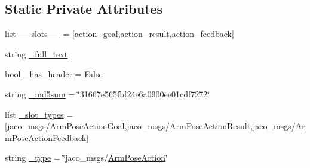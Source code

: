 \subsection*{Static Private Attributes}
\begin{DoxyCompactItemize}
\item 
list \hyperlink{classjaco__msgs_1_1msg_1_1__ArmPoseAction_1_1ArmPoseAction_a39a608192fd350c87948d9a54454e358}{\+\_\+\+\_\+slots\+\_\+\+\_\+} = \mbox{[}\textquotesingle{}\hyperlink{classjaco__msgs_1_1msg_1_1__ArmPoseAction_1_1ArmPoseAction_ababc0bb07c8926c3e8d55dfd2ddacdf4}{action\+\_\+goal}\textquotesingle{},\textquotesingle{}\hyperlink{classjaco__msgs_1_1msg_1_1__ArmPoseAction_1_1ArmPoseAction_a15c3aa8e8baead8d23478de23af61ca0}{action\+\_\+result}\textquotesingle{},\textquotesingle{}\hyperlink{classjaco__msgs_1_1msg_1_1__ArmPoseAction_1_1ArmPoseAction_a4e1fca881430990eb71fe999027640aa}{action\+\_\+feedback}\textquotesingle{}\mbox{]}
\item 
string \hyperlink{classjaco__msgs_1_1msg_1_1__ArmPoseAction_1_1ArmPoseAction_acb83d126dba77cf76e1612efa04754b5}{\+\_\+full\+\_\+text}
\item 
bool \hyperlink{classjaco__msgs_1_1msg_1_1__ArmPoseAction_1_1ArmPoseAction_a55f6889a5be10bdf4116282783bdaf60}{\+\_\+has\+\_\+header} = False
\item 
string \hyperlink{classjaco__msgs_1_1msg_1_1__ArmPoseAction_1_1ArmPoseAction_a8940e31e74f95f0132f4956a4d563b0d}{\+\_\+md5sum} = \char`\"{}31667e565fbf24e6a0900ee01cdf7272\char`\"{}
\item 
list \hyperlink{classjaco__msgs_1_1msg_1_1__ArmPoseAction_1_1ArmPoseAction_afa6ebc65498cb429b5abf5561c7889b5}{\+\_\+slot\+\_\+types} = \mbox{[}\textquotesingle{}jaco\+\_\+msgs/\hyperlink{classjaco__msgs_1_1msg_1_1__ArmPoseActionGoal_1_1ArmPoseActionGoal}{Arm\+Pose\+Action\+Goal}\textquotesingle{},\textquotesingle{}jaco\+\_\+msgs/\hyperlink{classjaco__msgs_1_1msg_1_1__ArmPoseActionResult_1_1ArmPoseActionResult}{Arm\+Pose\+Action\+Result}\textquotesingle{},\textquotesingle{}jaco\+\_\+msgs/\hyperlink{classjaco__msgs_1_1msg_1_1__ArmPoseActionFeedback_1_1ArmPoseActionFeedback}{Arm\+Pose\+Action\+Feedback}\textquotesingle{}\mbox{]}
\item 
string \hyperlink{classjaco__msgs_1_1msg_1_1__ArmPoseAction_1_1ArmPoseAction_aeb56bfbee3623960b16d34cf07c743ea}{\+\_\+type} = \char`\"{}jaco\+\_\+msgs/\hyperlink{classjaco__msgs_1_1msg_1_1__ArmPoseAction_1_1ArmPoseAction}{Arm\+Pose\+Action}\char`\"{}
\end{DoxyCompactItemize}



